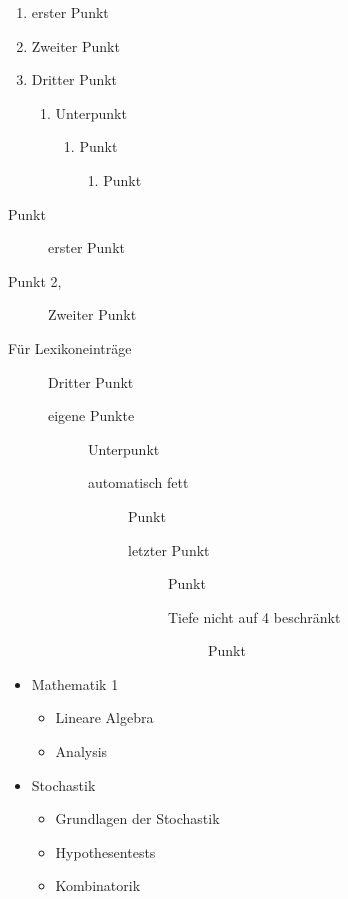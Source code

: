 \documentclass[a4paper, 12pt]{article} %
\begin{document}
\begin{enumerate}
    \item erster Punkt
    \item Zweiter Punkt
    \item Dritter Punkt
    \begin{enumerate}
        \item Unterpunkt
        \begin{enumerate}
            \item Punkt
            \begin{enumerate}
                \item Punkt
            \end{enumerate}
        \end{enumerate}
    \end{enumerate}
\end{enumerate}

\begin{description}
    \item[Punkt] erster Punkt
    \item[Punkt 2,] Zweiter Punkt
    \item[Für Lexikoneinträge] Dritter Punkt
    \begin{description}
        \item[eigene Punkte] Unterpunkt
        \begin{description}
            \item[automatisch fett] Punkt
            \begin{description}
                \item[letzter Punkt] Punkt
                \begin{description}
                    \item[Tiefe nicht auf 4 beschränkt] Punkt
                \end{description}
            \end{description}
        \end{description}
    \end{description}
\end{description}

\begin{itemize}
    \item Mathematik 1
    \begin{itemize}
        \item Lineare Algebra
        \item Analysis
    \end{itemize}
    \item Stochastik
    \begin{itemize}
        \item Grundlagen der Stochastik
        \item Hypothesentests
        \item Kombinatorik
    \end{itemize}
\end{itemize}
\end{document}
